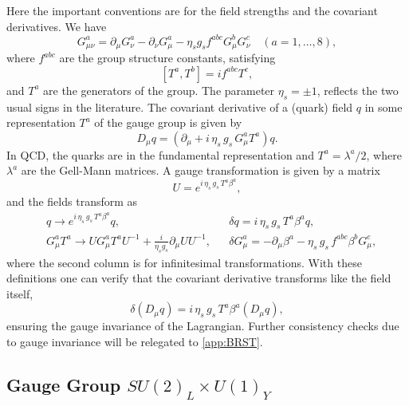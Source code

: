 \documentclass{ws-ijmpa}
\begin{document}
Here the important conventions are for the field strengths and the
covariant derivatives. We have
%
\begin{equation}
  \label{eq:apD-49}
  G_{\mu\nu}^a = \partial_{\mu} G_\nu^a -\partial_{\nu} G_\mu^a  - \eta_s
 g_s f^{abc} G_\mu^b G_\nu^c \quad (a=1,\ldots, 8) ,
\end{equation}
%
where $f^{abc}$ are the group structure constants, satisfying
%
\begin{equation}
  \label{eq:apD-50}
  \left[ T^a , T^b \right]= i f^{abc} T^c,
\end{equation}
%
and $T^a$ are the generators of the group.
The parameter $\eta_s = \pm 1$,
reflects the two usual signs in the literature.
The covariant derivative of
a (quark) field $q$ in some representation $T^a$ of the gauge group
is given by
%
\begin{equation}
  \label{eq:apD-90}
  D_\mu q = \left( \partial_\mu + i\,\eta_s\, g_s\, G^a_\mu T^a \right) q .
\end{equation}
%
In QCD,
the quarks are in the fundamental representation and $T^a=\lambda^a/2$,
where $\lambda^a$ are the Gell-Mann matrices.
A gauge transformation is given by a matrix
%
\begin{equation}
  \label{eq:92}
  U = e^{i\, \eta_s\,g_s\, T^a \beta^a},
\end{equation}
%
and the fields transform as
%
\begin{align}
\label{eq:121}
  &q \rightarrow e^{i\, \eta_s\, g_s\, T^a \beta^a} q ,
&&\delta q =i\, \eta_s\,g_s\, T^a \beta^a q ,
\nonumber\\[+2mm]
&G_\mu^a T^a \rightarrow U  G_\mu^a T^a U^{-1} + \frac{i}{\eta_s g_s} \partial_\mu U
  U^{-1} ,
&&\delta G_\mu^a = - \partial_\mu \beta^a -\eta_s\, g_s\,
  f^{abc} \beta^b G_\mu^c ,
\end{align}
%
where the second column is for infinitesimal transformations. With
these definitions one can verify that the covariant derivative
transforms like the field itself,
%
\begin{equation}
  \label{eq:apD-93}
  \delta (D_\mu q) = i\, \eta_s\,g_s\, T^a \beta^a (D_\mu q) ,
\end{equation}
%
ensuring the gauge invariance of the Lagrangian.
Further consistency checks due to gauge invariance will
be relegated to \ref{app:BRST}.



\subsection{Gauge Group $SU(2)_L \times U(1)_Y$}
\end{document}

